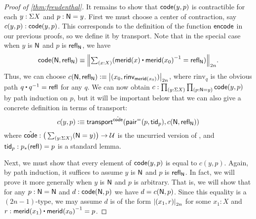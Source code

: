 \begin{proof}[Proof of \autoref{thm:freudenthal}]
  It remains to show that $\code(y,p)$ is contractible for each $y:\susp X$ and $p:\north=y$.
  First we must choose a center of contraction, say $c(y,p):\code(y,p)$.
  This corresponds to the definition of the function $\encode$ in our previous proofs, so we define it by transport.
  Note that in the special case when $y$ is $\north$ and $p$ is $\refl{\north}$, we have
  \[\code(\north,\refl{\north}) \jdeq \trunc{2n}{\tsm{x:X} (\merid(x) \ct \opp{\merid(x_0)} = \refl{\north})}.\]
  Thus, we can choose $c(\north,\refl{\north})\defeq \tproj{2n}{(x_0,\mathsf{rinv}_{\merid(x_0)})}$, where $\mathrm{rinv}_q$ is the obvious path $q\ct\opp q = \refl{}$ for any $q$.
  We can now obtain $c:\prd{y:\susp X}{p:\north=y} \code(y,p)$ by path induction on $p$, but it will be important below that we can also give a concrete definition in terms of transport:
  \[ c(y,p) \defeq \transfib{\hat{\code}}{\pairpath(p,\mathsf{tid}_p)}{c(\north,\refl{\north})}
  \]
  where $\hat{\code}: \big(\sm{y:\susp X} (\north=y)\big) \to \type$ is the uncurried version of \code, and $\mathsf{tid}_p:\trans{p}{\refl{}} = p$ is a standard lemma.

  Next, we must show that every element of $\code(y,p)$ is equal to $c(y,p)$.
  Again, by path induction, it suffices to assume $y$ is $\north$ and $p$ is $\refl{\north}$.
  In fact, we will prove it more generally when $y$ is $\north$ and $p$ is arbitrary.
  That is, we will show that for any $p:\north=\north$ and $d:\code(\north,p)$ we have $d = c(\north,p)$.
  Since this equality is a $(2n-1)$-type, we may assume $d$ is of the form $\tproj{2n}{(x_1,r)}$ for some $x_1:X$ and $r:\merid(x_1) \ct \opp{\merid(x_0)} = p$.


\end{proof}
